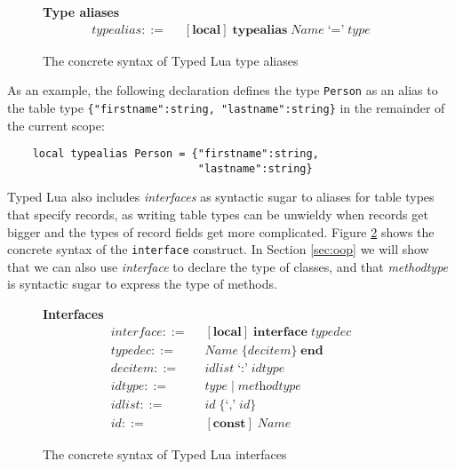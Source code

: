 \begin{figure}[!ht]
\textbf{Type aliases}\\
\dstart
\begin{align*}
\textit{typealias} ::= & \;\; [\textbf{local}] \; \textbf{typealias} \; \textit{Name} \; \texttt{`='} \; \textit{type}
\end{align*}
\dend
\caption{The concrete syntax of Typed Lua type aliases}
\label{fig:aliases}
\end{figure}

As an example, the following declaration defines the type \texttt{Person}
as an alias to the table type \texttt{\{"firstname":string, "lastname":string\}}
in the remainder of the current scope:
\begin{verbatim}
    local typealias Person = {"firstname":string,
                              "lastname":string}
\end{verbatim}

Typed Lua also includes \emph{interfaces} as syntactic sugar to aliases
for table types that specify records, as writing table types can be unwieldy
when records get bigger and the types of record fields get more complicated.
Figure \ref{fig:interfaces} shows the concrete syntax of the
\texttt{interface} construct.
In Section \ref{sec:oop} we will show that we can also use \emph{interface} to
declare the type of classes, and that \emph{methodtype} is syntactic
sugar to express the type of methods.

\begin{figure}[!ht]
\textbf{Interfaces}\\
\dstart
\begin{align*}
\textit{interface} ::= & \;\; [\textbf{local}] \; \textbf{interface} \; \textit{typedec}\\
\textit{typedec} ::= & \;\; \textit{Name} \; \{\textit{decitem}\} \; \textbf{end}\\
\textit{decitem} ::= & \;\; \textit{idlist} \; \texttt{`:'} \; \textit{idtype}\\
\textit{idtype} ::= & \;\; \textit{type} \; | \; \textit{methodtype}\\
\textit{idlist} ::= & \;\; \textit{id} \; \{\texttt{`,'} \; \textit{id}\}\\
\textit{id} ::= & \;\; [\textbf{const}] \; \textit{Name}
\end{align*}
\dend
\caption{The concrete syntax of Typed Lua interfaces}
\label{fig:interfaces}
\end{figure}

